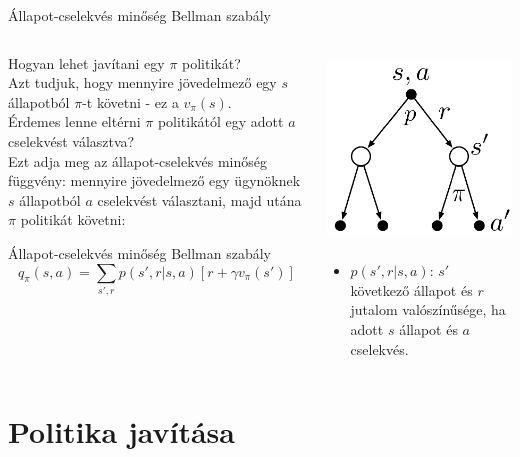 \documentclass[english, aspectratio=169]{beamer}
\makeatletter
\let\origtableofcontents=\tableofcontents
\def\tableofcontents{\@ifnextchar[{\origtableofcontents}{\gobbletableofcontents}}
\def\gobbletableofcontents#1{\origtableofcontents}
\makeatother
\begin{document}
\begin{frame}{Állapot-cselekvés minőség Bellman szabály}
\begin{columns}
\begin{column}{.6\textwidth}
Hogyan lehet javítani egy $\pi$ politikát?\\
Azt tudjuk, hogy mennyire jövedelmező egy $s$ állapotból $\pi$-t követni - ez a $v_\pi(s)$.\\ Érdemes lenne eltérni $\pi$ politikától egy adott $a$ cselekvést választva?\\
Ezt adja meg az állapot-cselekvés minőség függvény: mennyire jövedelmező egy ügynöknek $s$ állapotból $a$ cselekvést választani, majd utána $\pi$ politikát követni:\\
\begin{block}{Állapot-cselekvés minőség Bellman szabály}
\[
q_{\pi}(s,a)=\sum_{s',r}p\left(s',r|s,a\right)\left[r+\gamma v_{\pi}\left(s'\right)\right]
\]
\end{block}
\end{column}
\begin{column}{.45\textwidth}
\begin{center}
\includegraphics[width=5cm, height=5cm, keepaspectratio]{images/reinf_12.png}
\end{center}
\begin{itemize}
	\item $p\left(s',r|s,a\right)$: $s'$ következő állapot és $r$ jutalom valószínűsége, ha adott $s$ állapot és $a$ cselekvés.
\end{itemize}
\end{column}
\end{columns}
\end{frame}

\section{Politika javítása}

\begin{frame}
\tableofcontents[currentsection]
\end{frame}
\end{document}
